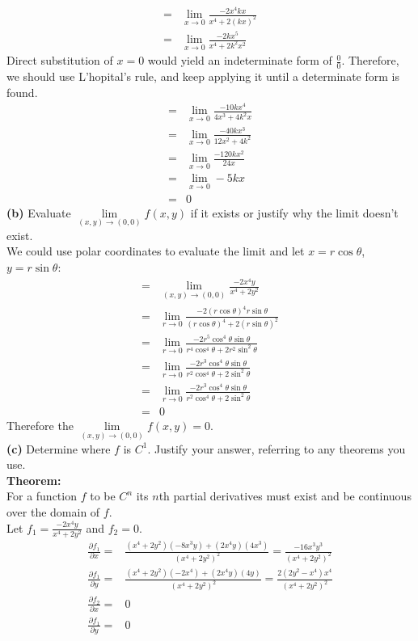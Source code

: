 \documentclass[12pt]{article}
\begin{document}
\begin{align*}
	=&\lim_{x \rightarrow 0}\frac{-2x^4kx}{x^4+2(kx)^2}\\
	=&\lim_{x \rightarrow 0}\frac{-2kx^5}{x^4+2k^2x^2}
\end{align*}
Direct substitution of $x=0$ would yield an indeterminate form of $\frac{0}{0}$. Therefore, we should use L'hopital's rule, and keep applying it until a determinate form is found. 
\begin{align*}
	=&\lim_{x \rightarrow 0}\frac{-10kx^4}{4x^3+4k^2x}\\
	=&\lim_{x \rightarrow 0}\frac{-40kx^3}{12x^2+4k^2}\\
	=&\lim_{x \rightarrow 0}\frac{-120kx^2}{24x}\\
	=&\lim_{x \rightarrow 0}-5kx\\
	=&0
\end{align*}
\textbf{(b)} Evaluate $\lim\limits_{(x,y) \rightarrow (0,0)}f(x,y)$ if it exists or justify why the limit doesn't exist.\\
\medskip
We could use polar coordinates to evaluate the limit and let $x=r\cos\theta$, $y=r\sin\theta$:
\begin{align*}
	=&\lim_{(x,y) \rightarrow (0,0)}\frac{-2x^4y}{x^4+2y^2}\\
	=&\lim_{r \rightarrow 0}\frac{-2(r\cos\theta)^4r\sin\theta}{(r\cos\theta)^4+2(r\sin \theta)^2}\\
	=&\lim_{r \rightarrow 0}\frac{-2r^5\cos^4 \theta \sin \theta}{r^4\cos^4 \theta+2r^2\sin^2 \theta}\\
	=&\lim_{r \rightarrow 0}\frac{-2r^3\cos^4 \theta \sin \theta}{r^2\cos^4 \theta+2\sin^2 \theta}\\
	=&\lim_{r \rightarrow 0}\frac{-2r^3\cos^4 \theta \sin \theta}{r^2\cos^4 \theta+2\sin^2 \theta}\\
	=&0
\end{align*}
Therefore the $\lim\limits_{(x,y) \rightarrow (0,0)}f(x,y)=0$.\\
\medskip
\textbf{(c)} Determine where $f$ is $C^1$. Justify your answer, referring to any theorems you use.\\
\medskip
\textbf{Theorem:}\\
For a function $f$ to be $C^n$ its $n$th partial derivatives must exist and be continuous over the domain of $f$.\\
\medskip
Let $f_1=\frac{-2x^4y}{x^4+2y^2}$ and $f_2=0$.
\begin{align*}
	\frac{\partial f_1}{\partial x}=&\frac{(x^4+2y^2)(-8x^3y)+(2x^4y)(4x^3)}{(x^4+2y^2)^2}=\frac{-16x^3y^3}{(x^4+2y^2)^2}\\
	\frac{\partial f_1}{\partial y}=&\frac{(x^4+2y^2)(-2x^4)+(2x^4y)(4y)}{(x^4+2y^2)^2}=\frac{2(2y^2-x^4)x^4}{(x^4+2y^2)^2}\\
	\frac{\partial f_2}{\partial x}=&0\\
	\frac{\partial f_1}{\partial y}=&0
\end{align*}
\end{document}
